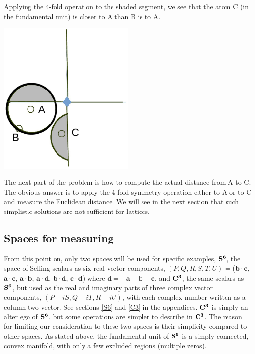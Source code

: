 \documentclass[preprint]{iucr}              %
\numberwithin{equation}{section}
\newcommand{\SVI}[0]{$\bf{S^{6}}$}
\newcommand{\CIII}[0]{$\bf{C^{3}}$}
\begin{document}
	Applying the 4-fold operation to the shaded segment, we
	see that the atom C (in the fundamental unit) is closer to A
	than B is to A.
	
	\includegraphics[width = 0.5\textwidth ]{4_5_1}
	
	The next part of the problem is how to compute the actual 
	distance from A to C. The obvious answer is to apply the 
	4-fold symmetry operation either to A or to C and measure
	the Euclidean distance. We will see in the next section that
	such simplistic solutions are not sufficient for lattices.
	
	\subsection{Spaces for measuring}
	
	From this point on, only two spaces will be used for
	specific examples, \SVI{}, the
	space of Selling scalars as six real vector components,
	$( P,Q,R,S,T,U )$ = 
	({$\mathbf{b} \cdot \mathbf{c}$},
	{$\mathbf{a} \cdot \mathbf{c}$},
	{$\mathbf{a} \cdot \mathbf{b}$},
	{$\mathbf{a} \cdot \mathbf{d}$},
	{$\mathbf{b} \cdot \mathbf{d}$},
	{$\mathbf{c} \cdot \mathbf{d}$}) where {$\mathbf{d}=-\mathbf{a}-\mathbf{b}-\mathbf{c}$}, 
	 and \CIII{}, the same scalars as \SVI{}, but used as the real and imaginary parts
	of three complex vector components, $(P+iS, Q+iT, R+iU)$, with each complex number written as a column two-vector.  See sections \ref{S6} and
	\ref{C3} in the appendices. \CIII{} is simply an alter ego of \SVI{}, but 
	some operations are simpler to describe in \CIII{}. The
	reason for limiting our consideration to these two spaces is their simplicity
	compared to other spaces. As stated above, the fundamental
	unit of \SVI{} is a simply-connected, convex manifold, with
	only a few excluded regions (multiple zeros).
	
\end{document}

